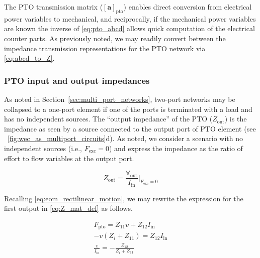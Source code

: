 \documentclass[lettersize,journal]{IEEEtran}
\begin{document}
\clearpage

\noindent{}The PTO transmission matrix ($\left[ \mathbf{a} \right]_{\textrm{pto}}$) enables direct conversion from electrical power variables to mechanical, and reciprocally, if the mechanical power variables are known the inverse of \eqref{eq:pto_abcd} allows quick computation of the electrical counter parts.
As previously noted, we may readily convert between the impedance transmission representations for the PTO network via \eqref{eq:abcd_to_Z}.

\subsubsection{PTO input and output impedances}\label{sec:pto_input_and_output_impedances}

As noted in Section~\ref{sec:multi_port_networks}, two-port networks may be collapsed to a one-port element if one of the ports is terminated with a load and has no independent sources.
The ``output impedance'' of the PTO ($Z_{\textrm{out}}$) is the impedance as seen by a source connected to the output port of PTO element (see \figurename~\ref{fig:wec_as_multiport_circuits}d).
As noted, we consider a scenario with no independent sources (i.e., $F_{\textrm{exc}} = 0$) and express the impedance as the ratio of effort to flow variables at the output port. 

\begin{equation}
        Z_{\textrm{out}} = \frac{\forall_{\textrm{out}}}{I_{\textrm{in}}} \bigg\vert_{F_{\textrm{exc}}=0}
        \label{eq:Zout_1}
\end{equation}

\noindent{}Recalling \eqref{eq:eom_rectilinear_motion}, we may rewrite the expression for the first output in \eqref{eq:Z_mat_def} as follows.

\begin{subequations}
        \begin{align}
                F_{\textrm{pto}} = Z_{11} v + Z_{12} I_{\textrm{in}} \label{eq:Zout_Fpto_1} \\[0.5em]
                -v (Z_i + Z_{11}) = Z_{12} I_{\textrm{in}} \label{eq:Zout_Fpto_2} \\[0.5em]
                \frac{v}{I_{\textrm{in}}} = -\frac{Z_{12}}{Z_i + Z_{11}} \label{eq:Zout_Fpto_3}
        \end{align}
        \label{eq:Zout_Fpto}
\end{subequations}
\end{document}

